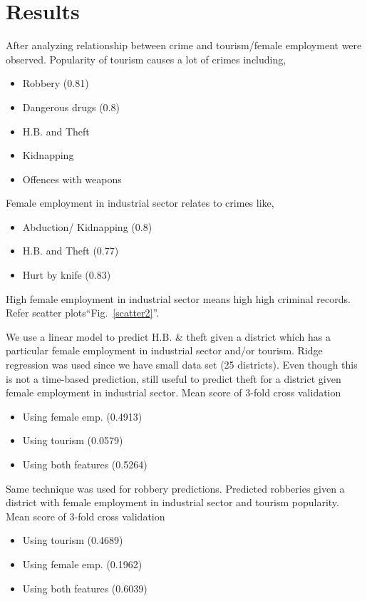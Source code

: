 \documentclass[conference]{IEEEtran}
\begin{document}
\section{Results}
After analyzing relationship between crime and tourism/female employment were observed. Popularity of tourism causes a lot of crimes including,
\begin{itemize}
    \item Robbery (0.81)
    \item Dangerous drugs (0.8)
    \item H.B. and Theft
    \item Kidnapping
    \item Offences with weapons
\end{itemize}
Female employment in industrial sector relates to crimes like,
\begin{itemize}
    \item Abduction/ Kidnapping (0.8)
    \item H.B. and Theft (0.77)
    \item Hurt by knife (0.83)
\end{itemize}
High female employment in industrial sector means high high criminal records. Refer scatter plots``Fig.~\ref{scatter2}''.\par
We use a linear model to predict H.B. & theft given a district which has a particular female employment in industrial sector and/or tourism. Ridge regression was used since we have small data set (25 districts). Even though this is not a time-based prediction, still useful to predict theft for a district given female employment in industrial sector. Mean score of 3-fold cross validation
\begin{itemize}
    \item Using female emp. (0.4913)
    \item Using tourism (0.0579)
    \item Using both features (0.5264)
\end{itemize}
Same technique was used for robbery predictions. Predicted robberies given a district with female employment in industrial sector and tourism popularity. Mean score of 3-fold cross validation 
\begin{itemize}
    \item Using tourism (0.4689)
    \item Using female emp. (0.1962)
    \item Using both features (0.6039)
\end{itemize}
\end{document}
